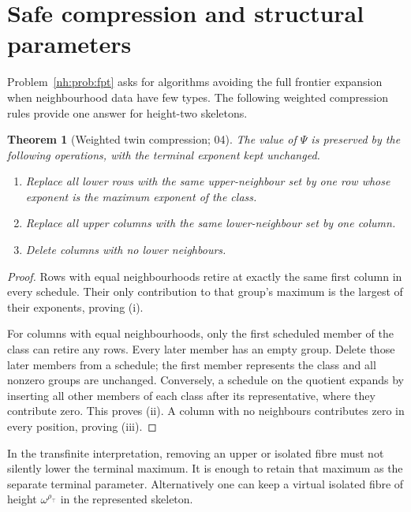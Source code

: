 \documentclass[11pt,a4paper]{article}
\newtheorem{theorem}{Theorem}[section]
\theoremstyle{definition}
\theoremstyle{remark}
\newcommand{\rtop}{\rho_{\top}}
\begin{document}
\section{Safe compression and structural parameters}\label{nh:ur:sec:compression}
\setcounter{equation}{0}

Problem~\ref{nh:prob:fpt} asks for algorithms avoiding the full frontier
expansion when neighbourhood data have few types. The following weighted
compression rules provide one answer for height-two skeletons.

\begin{theorem}[Weighted twin compression; 04]\label{nh:ur:thm:twins}
The value of $\Psi$ is preserved by the following operations, with the
terminal exponent kept unchanged.
\begin{enumerate}[label=(\roman*)]
\item Replace all lower rows with the same upper-neighbour set by one row
whose exponent is the maximum exponent of the class.
\item Replace all upper columns with the same lower-neighbour set by one
column.
\item Delete columns with no lower neighbours.
\end{enumerate}
\end{theorem}
\begin{proof}
Rows with equal neighbourhoods retire at exactly the same first column in
every schedule. Their only contribution to that group's maximum is the
largest of their exponents, proving (i).

For columns with equal neighbourhoods, only the first scheduled member of the
class can retire any rows. Every later member has an empty group. Delete
those later members from a schedule; the first member represents the class
and all nonzero groups are unchanged. Conversely, a schedule on the quotient
expands by inserting all other members of each class after its
representative, where they contribute zero. This proves (ii). A column with
no neighbours contributes zero in every position, proving (iii).
\end{proof}

In the transfinite interpretation, removing an upper or isolated fibre must
not silently lower the terminal maximum. It is enough to retain that maximum
as the separate terminal parameter. Alternatively one can keep a virtual
isolated fibre of height $\omega^{\rtop}$ in the represented skeleton.
\end{document}
